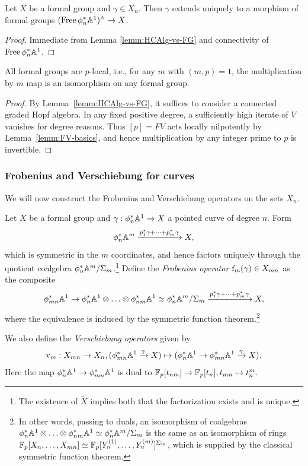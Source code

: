 \begin{corollary} \label{cor:Free-FG}
Let $X$ be a formal group and $\gamma \in X_n$.
Then $\gamma$ extends uniquely to a morphism of formal groups $(\operatorname{Free}\phi_n^*\mathbb A^1)^\wedge \to X$.
\end{corollary}
\begin{proof}
Immediate from Lemma \ref{lemm:HCAlg-vs-FG} and connectivity of $\operatorname{Free}\phi_n^*\mathbb A^1$.
\end{proof}

\begin{corollary} \label{cor:fg-p-local}
All formal groups are $p$-local, i.e., for any $m$ with $(m,p)=1$, the multiplication by $m$ map is an isomorphism on any formal group.
\end{corollary}
\begin{proof}
By Lemma~\ref{lemm:HCAlg-vs-FG}, it suffices to consider a connected graded Hopf algebra. In any fixed positive degree, a sufficiently high iterate of $V$ vanishes for degree reasons. Thus $[p]=FV$ acts locally nilpotently by Lemma~\ref{lemm:FV-basics}, and hence multiplication by any integer prime to $p$ is invertible.
\end{proof}

\subsubsection{Frobenius and Verschiebung for curves}
We will now construct the Frobenius and Verschiebung operators on the sets $X_n$.

\begin{definition}
Let $X$ be a formal group and $\gamma: \phi_n^* \mathbb A^1 \to X$ a pointed curve of degree $n$.
Form \[ \phi_n^* \mathbb A^m \xrightarrow{p_1^*\gamma + \dots + p_m^*\gamma} X, \] which is symmetric in the $m$ coordinates, and hence factors uniquely through the quotient coalgebra $\phi_n^*\mathbb A^m/\Sigma_m$.\footnote{The existence of $\tilde X$ implies both that the factorization exists and is unique.}
Define the \emph{Frobenius operator} $\mathrm f_m(\gamma) \in X_{mn}$ as the composite \[ \phi_{mn}^*\A^1 \to \phi_n^*\A^1 \htimes \dots \htimes \phi_{nm}^* \A^1 \wequi \phi_n^*\A^m/\Sigma_m \xrightarrow{p_1^*\gamma + \dots + p_m^*\gamma} X, \] where the equivalence is induced by the symmetric function theorem.\footnote{In other words, passing to duals, an isomorphism of coalgebras $\phi_n^*\A^1 \htimes \dots \htimes \phi_{nm}^* \A^1 \wequi \phi_n^*\A^m/\Sigma_m$ is the same as an isomorphism of rings $\mathbb{F}_p[X_n, \dots, X_{mn}] \simeq \mathbb{F}_p[Y_n^{(1)}, \dots, Y_n^{(m)}]^{\Sigma_m}$, which is supplied by the classical symmetric function theorem.}

We also define the \emph{Verschiebung operators} given by \[ \mathrm v_m: X_{mn} \to X_{n}, (\phi_{mn}^*\mathbb A^1 \xrightarrow{\gamma} X) \mapsto (\phi_n^* \mathbb A^1 \to \phi_{mn}^* \mathbb A^1 \xrightarrow{\gamma} X). \]
Here the map $\phi_n^* \mathbb A^1 \to \phi_{mn}^* \mathbb A^1$ is dual to $\mathbb{F}_p[t_{nm}] \to \mathbb{F}_p[t_n], t_{mn} \mapsto t_n^m$.
\end{definition}

